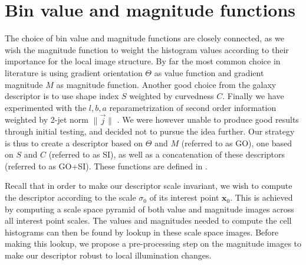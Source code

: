 \documentclass[thesis.tex]{subfiles}
\def\x{\mathbf{x}}
\begin{document}
\section{Bin value and magnitude functions}
\label{sec:valueMagnitudeFunctions}
%
The choice of bin value and magnitude functions are closely connected, as we wish the magnitude function to weight the histogram values according to their importance for the local image structure. By far the most common choice in literature \cite{lowe2004distinctive,ke2004pca,mikolajczyk2005performance,tola2008fast} is using gradient orientation $\Theta$ as value function and gradient magnitude $M$ as magnitude function. Another good choice from the galaxy descriptor \cite{pedersen2013shape} is to use shape index $S$ weighted by curvedness $C$. Finally we have experimented with the $l,b,a$ reparametrization of second order information weighted by 2-jet norm $\| \overset{\rightarrow}{j} \|$ \citep{griffin2007second}. We were however unable to produce good results through initial testing, and decided not to pursue the idea further. Our strategy is thus to create a descriptor based on $\Theta$ and $M$ (referred to as GO), one based on $S$ and $C$ (referred to as SI), as well as a concatenation of these descriptors (referred to as GO+SI). These functions are defined in .

Recall that in order to make our descriptor scale invariant, we wish to compute the descriptor according to the scale $\sigma_0$ of its interest point $\x_0$. This is achieved by computing a scale space pyramid of both value and magnitude images across all interest point scales. The values and magnitudes needed to compute the cell histograms can then be found by lookup in these scale space images. Before making this lookup, we propose a pre-processing step on the magnitude images to make our descriptor robust to local illumination changes.
%
\end{document}
